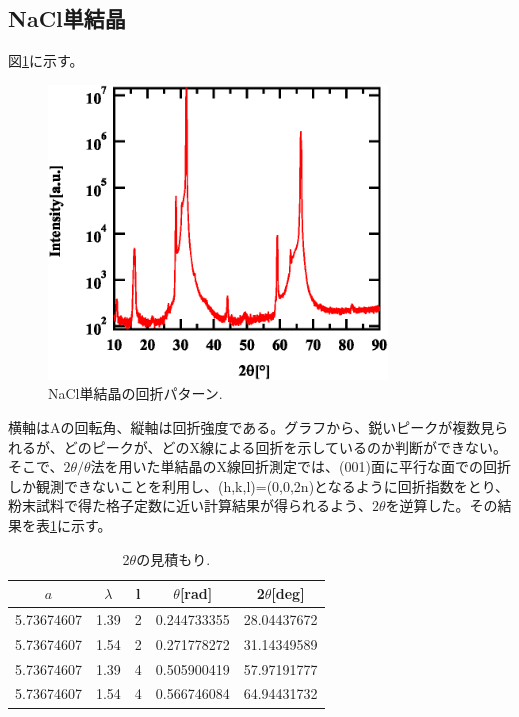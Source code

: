 \documentclass[11pt,a4j,uplatex]{jsarticle}
\begin{document}
\newpage
\subsection{NaCl単結晶}



図\ref{bulk}に示す。

\begin{figure}[htb]
 \centering
 \includegraphics[clip,width=9cm]{FigBulk.eps}
 \caption{NaCl単結晶の回折パターン.}
 \label{bulk}
\end{figure}

横軸はAの回転角、縦軸は回折強度である。グラフから、鋭いピークが複数見られるが、どのピークが、どのX線による回折を示しているのか判断ができない。そこで、$2\theta/\theta$法を用いた単結晶のX線回折測定では、(001)面に平行な面での回折しか観測できないことを利用し、(h,k,l)=(0,0,2n)となるように回折指数をとり、粉末試料で得た格子定数に近い計算結果が得られるよう、$2\theta$を逆算した。その結果を表\ref{gyakusan}に示す。

\begin{table}[htbp]
\begin{center}
\caption{2$\theta$の見積もり.}
\begin{tabular}{|c|c|c|c|c|}\hline
$a$ & $\lambda$ & l & $\theta$[rad] & 2$\theta$[deg]\\  \hline  \hline
5.73674607 & 1.39 & 2 & 0.244733355 & 28.04437672\\
5.73674607 & 1.54 & 2 & 0.271778272 & 31.14349589\\
5.73674607 & 1.39 & 4 & 0.505900419 & 57.97191777\\
5.73674607 & 1.54 & 4 & 0.566746084 & 64.94431732\\ \hline
\end{tabular}
\label{gyakusan}
\end{center}
\end{table}
\end{document}

